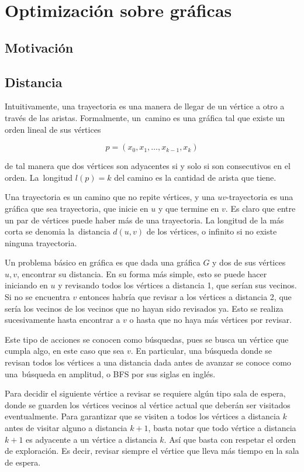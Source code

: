 \chapter{Optimización sobre gráficas}

\section{Motivación}

\section{Distancia}

Intuitivamente, una trayectoria es una manera de llegar de un vértice a otro a
través de las aristas. Formalmente, un~camino es una gráfica tal
que existe un orden lineal de sus vértices

\[
    p = (x_{0}, x_{1}, \dots, x_{k-1}, x_{k})
\]

de tal manera que dos vértices son adyacentes si y solo si son consecutivos en
el orden. La~longitud $l(p) = k$ del camino es la cantidad de
arista que tiene.

Una trayectoria es un camino que no repite vértices, y una $uv$-trayectoria es
una gráfica que sea trayectoria, que inicie en $u$ y que termine en $v$. Es
claro que entre un par de vértices puede haber más de una trayectoria. La
longitud de la más corta se denomia la~distancia $d(u, v)$ de
los vértices, o infinito si no existe ninguna trayectoria.

Un problema básico en gráfica es que dada una gráfica $G$ y dos de sus vértices
$u, v$, encontrar su distancia. En su forma más simple, esto se puede hacer
iniciando en $u$ y revisando todos los vértices a distancia 1, que serían sus
vecinos. Si no se encuentra $v$ entonces habría que revisar a los vértices a
distancia 2, que sería los vecinos de los vecinos que no hayan sido revisados
ya. Esto se realiza sucesivamente hasta encontrar a $v$ o hasta que no haya más
vértices por revisar.

Este tipo de acciones se conocen como búsquedas, pues se busca un vértice que
cumpla algo, en este caso que sea $v$. En particular, una búsqueda donde se
revisan todos los vértices a una distancia dada antes de avanzar se conoce como
una~búsqueda en amplitud, o BFS por sus siglas en inglés.

Para decidir el siguiente vértice a revisar se requiere algún tipo sala de
espera, donde se guarden los vértices vecinos al vértice actual que deberán ser
visitados eventualmente. Para garantizar que se visiten a todos los vértices a
distancia $k$ antes de visitar alguno a distancia $k+1$, basta notar que todo
vértice a distancia $k+1$ es adyacente a un vértice a distancia $k$. Así que
basta con respetar el orden de exploración. Es decir, revisar siempre el vértice
que lleva más tiempo en la sala de espera.


